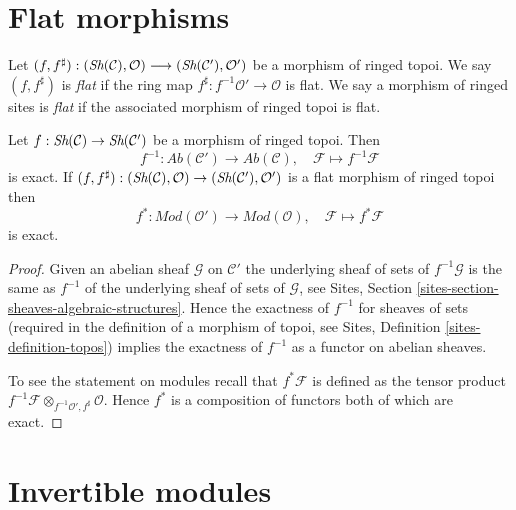 \section{Flat morphisms}
\label{section-flat-morphisms}

\begin{definition}
\label{definition-flat-morphism}
Let
$(f, f^\sharp) :
(\mathop{\textit{Sh}}\nolimits(\mathcal{C}), \mathcal{O})
\longrightarrow
(\mathop{\textit{Sh}}\nolimits(\mathcal{C}'), \mathcal{O}')$
be a morphism of ringed topoi. We say $(f, f^\sharp)$ is
{\it flat} if the ring map $f^\sharp : f^{-1}\mathcal{O}' \to \mathcal{O}$
is flat. We say a morphism of ringed sites is {\it flat}
if the associated morphism of ringed topoi is flat.
\end{definition}

\begin{lemma}
\label{lemma-flat-pullback-exact}
Let $f : \mathop{\textit{Sh}}\nolimits(\mathcal{C}) \to \mathop{\textit{Sh}}\nolimits(\mathcal{C}')$
be a morphism of ringed topoi. Then
$$
f^{-1} : \textit{Ab}(\mathcal{C}') \longrightarrow \textit{Ab}(\mathcal{C}),
\quad
\mathcal{F} \longmapsto f^{-1}\mathcal{F}
$$
is exact. If
$(f, f^\sharp) :
(\mathop{\textit{Sh}}\nolimits(\mathcal{C}), \mathcal{O})
\to
(\mathop{\textit{Sh}}\nolimits(\mathcal{C}'), \mathcal{O}')$
is a flat morphism of ringed topoi then
$$
f^* : \textit{Mod}(\mathcal{O}') \longrightarrow \textit{Mod}(\mathcal{O}),
\quad
\mathcal{F} \longmapsto f^*\mathcal{F}
$$
is exact.
\end{lemma}

\begin{proof}
Given an abelian sheaf $\mathcal{G}$ on $\mathcal{C}'$
the underlying sheaf of sets of $f^{-1}\mathcal{G}$ is the same
as $f^{-1}$ of the underlying sheaf of sets of $\mathcal{G}$, see
Sites, Section \ref{sites-section-sheaves-algebraic-structures}.
Hence the exactness of $f^{-1}$ for sheaves of sets (required in the
definition of a morphism of topoi, see
Sites, Definition \ref{sites-definition-topos})
implies the exactness of $f^{-1}$ as a functor on abelian sheaves.

\medskip\noindent
To see the statement on modules recall that $f^*\mathcal{F}$ is defined
as the tensor product
$f^{-1}\mathcal{F} \otimes_{f^{-1}\mathcal{O}', f^\sharp} \mathcal{O}$.
Hence $f^*$ is a composition of functors both of which are exact.
\end{proof}





\section{Invertible modules}
\label{section-invertible}

